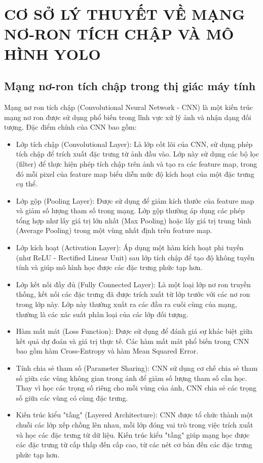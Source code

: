
\chapter{CƠ SỞ LÝ THUYẾT VỀ MẠNG NƠ-RON TÍCH CHẬP VÀ MÔ HÌNH YOLO}

\section{Mạng nơ-ron tích chập trong thị giác máy tính}

Mạng nơ ron tích chập (Convolutional Neural Network - CNN) là một kiến trúc mạng nơ ron được sử dụng phổ biến trong lĩnh vực xử lý ảnh và nhận dạng đối tượng. Đặc điểm chính của CNN bao gồm:

\begin{itemize}
	\item Lớp tích chập (Convolutional Layer): Là lớp cốt lõi của CNN, sử dụng phép tích chập để trích xuất đặc trưng từ ảnh đầu vào. Lớp này sử dụng các bộ lọc (filter) để thực hiện phép tích chập trên ảnh và tạo ra các feature map, trong đó mỗi pixel của feature map biểu diễn mức độ kích hoạt của một đặc trưng cụ thể.
	\item Lớp gộp (Pooling Layer): Được sử dụng để giảm kích thước của feature map và giảm số lượng tham số trong mạng. Lớp gộp thường áp dụng các phép tổng hợp như lấy giá trị lớn nhất (Max Pooling) hoặc lấy giá trị trung bình (Average Pooling) trong một vùng nhất định trên feature map.
	\item Lớp kích hoạt (Activation Layer): Áp dụng một hàm kích hoạt phi tuyến (như ReLU - Rectified Linear Unit) sau lớp tích chập để tạo độ không tuyến tính và giúp mô hình học được các đặc trưng phức tạp hơn.
	\item Lớp kết nối đầy đủ (Fully Connected Layer): Là một loại lớp nơ ron truyền thống, kết nối các đặc trưng đã được trích xuất từ lớp trước với các nơ ron trong lớp này. Lớp này thường xuất ra các đầu ra cuối cùng của mạng, thường là các xác suất phân loại của các lớp đối tượng.
	\item Hàm mất mát (Loss Function): Được sử dụng để đánh giá sự khác biệt giữa kết quả dự đoán và giá trị thực tế. Các hàm mất mát phổ biến trong CNN bao gồm hàm Cross-Entropy và hàm Mean Squared Error.
	\item Tính chia sẻ tham số (Parameter Sharing): CNN sử dụng cơ chế chia sẻ tham số giữa các vùng không gian trong ảnh để giảm số lượng tham số cần học. Thay vì học các trọng số riêng cho mỗi vùng của ảnh, CNN chia sẻ các trọng số giữa các vùng có cùng đặc trưng.
	\item Kiến trúc kiểu "tầng" (Layered Architecture): CNN được tổ chức thành một chuỗi các lớp xếp chồng lên nhau, mỗi lớp đóng vai trò trong việc trích xuất và học các đặc trưng từ dữ liệu. Kiến trúc kiểu "tầng" giúp mạng học được các đặc trưng từ cấp thấp đến cấp cao, từ các nét cơ bản đến các đặc trưng phức tạp hơn.
\end{itemize}


